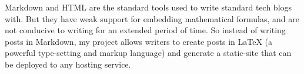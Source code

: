 
Markdown and HTML are the standard tools used to write standard tech blogs with. But they have weak support for embedding mathematical formulas, and are not conducive to writing for an extended period of time. So instead of writing posts in Markdown, my project allows writers to create posts in LaTeX (a powerful type-setting and markup language) and generate a static-site that can be deployed to any hosting service.